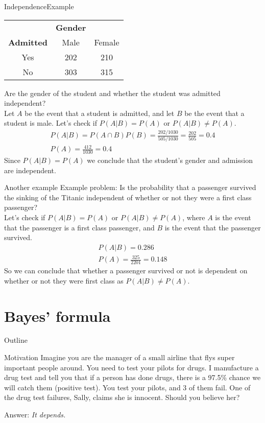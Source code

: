 \documentclass[xcolor=dvipsnames]{beamer}
\begin{document}
\begin{frame}{Independence}{Example}
\begin{center}
	\begin{tabular}{c|cc}
		& \textbf{Gender} & \\
		\textbf{Admitted} & Male & Female \\ \hline
		Yes & 202 & 210 \\
		No & 303 & 315
	\end{tabular}
\end{center}
Are the gender of the student and whether the student was admitted independent? \\ 
Let $A$ be the event that a student is admitted, and let $B$ be the event that a student is male. Let's check if $P(A|B) = P(A)$ or $P(A|B) \neq P(A)$.
\begin{gather*}
	P(A|B) = P(A \cap B) P(B) = \frac{202/1030}{505/1030}= \frac{202}{505} = 0.4 \\
	P(A) = \frac{412}{1030} = 0.4
\end{gather*}
Since $P(A|B) = P(A)$ we conclude that the student's gender and admission are independent. 
\end{frame}

\begin{frame}{Another example}
	Example problem: Is the probability that a passenger survived the sinking of the Titanic independent of whether or not they were a first class passenger? \\
	Let's check if $P(A|B) = P(A)$ or $P(A|B) \neq P(A)$, where $A$ is the event that the passenger is a first class passenger, and $B$ is the event that the passenger survived.
	\begin{gather*}
		P(A|B) = 0.286 \\
		P(A) = \frac{325}{2201} = 0.148
	\end{gather*}
	So we can conclude that whether a passenger survived or not is dependent on whether or not they were first class as $P(A|B) \neq P(A)$.
\end{frame}

\section{Bayes' formula}
\begin{frame}{Outline}
\tableofcontents[currentsection,subsectionstyle=show/shaded/hide]
\end{frame}

\begin{frame}{Motivation}
Imagine you are the manager of a small airline that flys super important people around. You need to test your pilots for drugs. I manufacture a drug test and tell you that if a person has done drugs, there is a 97.5\% chance we will catch them (positive test). You test your pilots, and 3 of them fail. One of the drug test failures, Sally, claims she is innocent. Should you believe her? 

\vspace{10pt}
Answer: \emph{It depends.}

\end{frame}
\end{document}
